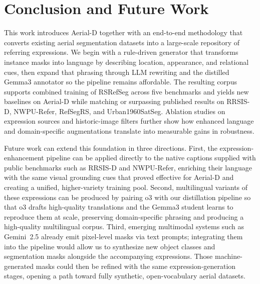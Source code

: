 
\section{Conclusion and Future Work}
\label{sec:conclusion}

This work introduces Aerial\mbox{-}D together with an end-to-end methodology that converts existing aerial segmentation datasets into a large-scale repository of referring expressions. We begin with a rule-driven generator that transforms instance masks into language by describing location, appearance, and relational cues, then expand that phrasing through LLM rewriting and the distilled Gemma3 annotator so the pipeline remains affordable. The resulting corpus supports combined training of RSRefSeg across five benchmarks and yields new baselines on Aerial\mbox{-}D while matching or surpassing published results on RRSIS-D, NWPU-Refer, RefSegRS, and Urban1960SatSeg. Ablation studies on expression sources and historic-image filters further show how enhanced language and domain-specific augmentations translate into measurable gains in robustness.

Future work can extend this foundation in three directions. First, the expression-enhancement pipeline can be applied directly to the native captions supplied with public benchmarks such as RRSIS-D and NWPU-Refer, enriching their language with the same visual grounding cues that proved effective for Aerial\mbox{-}D and creating a unified, higher-variety training pool. Second, multilingual variants of these expressions can be produced by pairing o3 with our distillation pipeline so that o3 drafts high-quality translations and the Gemma3 student learns to reproduce them at scale, preserving domain-specific phrasing and producing a high-quality multilingual corpus. Third, emerging multimodal systems such as Gemini 2.5\cite{gemini25} already emit pixel-level masks via text prompts; integrating them into the pipeline would allow us to synthesize new object classes and segmentation masks alongside the accompanying expressions. Those machine-generated masks could then be refined with the same expression-generation stages, opening a path toward fully synthetic, open-vocabulary aerial datasets.

